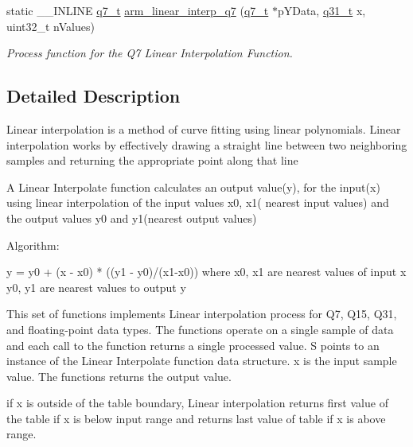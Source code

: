 \begin{DoxyCompactItemize}
static \+\_\+\+\_\+\+I\+N\+L\+I\+NE \hyperlink{arm__math_8h_ae541b6f232c305361e9b416fc9eed263}{q7\+\_\+t} \hyperlink{group___linear_interpolate_gacb0d44fe00aca0ba1d036d469a1763fc}{arm\+\_\+linear\+\_\+interp\+\_\+q7} (\hyperlink{arm__math_8h_ae541b6f232c305361e9b416fc9eed263}{q7\+\_\+t} $\ast$p\+Y\+Data, \hyperlink{arm__math_8h_adc89a3547f5324b7b3b95adec3806bc0}{q31\+\_\+t} x, uint32\+\_\+t n\+Values)
\begin{DoxyCompactList}\small\item\em Process function for the Q7 Linear Interpolation Function. \end{DoxyCompactList}\end{DoxyCompactItemize}


\subsection{Detailed Description}
Linear interpolation is a method of curve fitting using linear polynomials. Linear interpolation works by effectively drawing a straight line between two neighboring samples and returning the appropriate point along that line

\begin{DoxyParagraph}{}
 
\end{DoxyParagraph}
\begin{DoxyParagraph}{}
A Linear Interpolate function calculates an output value(y), for the input(x) using linear interpolation of the input values x0, x1( nearest input values) and the output values y0 and y1(nearest output values)
\end{DoxyParagraph}
\begin{DoxyParagraph}{Algorithm\+:}

\begin{DoxyPre}
      y = y0 + (x - x0) * ((y1 - y0)/(x1-x0))
      where x0, x1 are nearest values of input x
            y0, y1 are nearest values to output y
\end{DoxyPre}

\end{DoxyParagraph}
\begin{DoxyParagraph}{}
This set of functions implements Linear interpolation process for Q7, Q15, Q31, and floating-\/point data types. The functions operate on a single sample of data and each call to the function returns a single processed value. {\ttfamily S} points to an instance of the Linear Interpolate function data structure. {\ttfamily x} is the input sample value. The functions returns the output value.
\end{DoxyParagraph}
\begin{DoxyParagraph}{}
if x is outside of the table boundary, Linear interpolation returns first value of the table if x is below input range and returns last value of table if x is above range. 
\end{DoxyParagraph}


